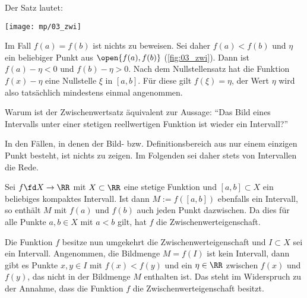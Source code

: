\begin{antwort}
  Der Satz lautet: 

  \medskip\noindent

  \begin{center}
    \texttt{[image: mp/03\_zwi]}
    \label{fig:03_zwi}
  \end{center}
  Im Fall $f(a)=f(b)$ ist nichts zu beweisen. Sei daher $f(a)<f(b)$ und  
  $\eta$ ein beliebiger Punkt aus $\open{ f(a), f(b) }$ (\sieheAbbildung\ref{fig:03_zwi}). Dann ist $f(a)-\eta < 0$ und 
  $f(b)-\eta > 0$. Nach dem Nullstellensatz hat die Funktion $f(x)-\eta$ eine 
  Nullstelle $\xi$ in $[a,b]$. Für diese gilt $f(\xi)=\eta$, der Wert $\eta$ 
  wird also tatsächlich mindestens einmal angenommen.
  \AntEnd
\end{antwort}

\begin{frage}\label{03_zwia}
  Warum ist der Zwischenwertsatz äquivalent zur Aussage: "`Das Bild eines 
  Intervalls unter einer stetigen reellwertigen Funktion ist wieder ein 
  Intervall?"'
\end{frage}

\begin{antwort}
  In den Fällen, in denen der Bild- bzw. Definitionsbereich aus nur einem 
  einzigen Punkt besteht, ist nichts zu zeigen. Im Folgenden sei daher stets 
  von  Intervallen die Rede.   

  Sei $f\fd X\to \RR$ mit $X\subset \RR$ eine stetige Funktion und 
  $[a,b]\subset X$ ein beliebiges kompaktes Intervall. Ist dann 
  $M:=f([a,b])$ ebenfalls ein Intervall, so enthält $M$ 
  mit $f(a)$ und $f(b)$ auch jeden Punkt dazwischen. Da dies für alle 
  Punkte $a,b\in X$ mit $a<b$ gilt, hat $f$ die Zwischenwerteigenschaft. 

  Die Funktion $f$ besitze nun umgekehrt die Zwischenwerteigenschaft und 
  $I\subset X$ sei ein Intervall. Angenommen, die Bildmenge $M=f(I)$ ist  
  kein Intervall, dann gibt es Punkte $x,y\in I$ 
  mit $f(x)< f(y)$ und ein 
  $\eta \in\RR$ zwischen $f(x)$ und $f(y)$, das nicht in der 
  Bildmenge $M$ enthalten ist. 
  Das steht im Widerspruch zu der Annahme, dass die 
  Funktion $f$ die Zwischenwerteigenschaft besitzt.
  \AntEnd  
\end{antwort} 

